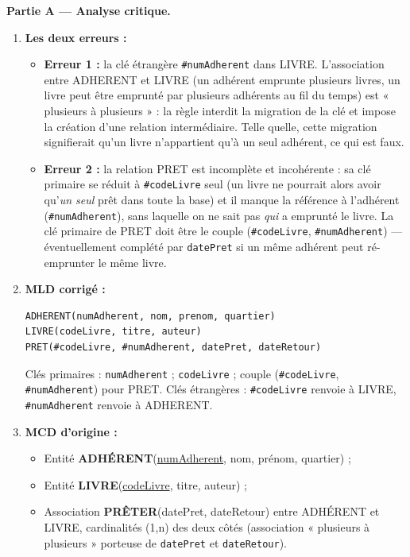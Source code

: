 \documentclass[11pt]{article}
\begin{document}
\begin{corrige}
\textbf{Partie A — Analyse critique.}

\begin{enumerate}
  \item \textbf{Les deux erreurs :}
  \begin{itemize}
    \item \textbf{Erreur 1 :} la clé étrangère \texttt{\#numAdherent} dans LIVRE. L'association entre ADHERENT et LIVRE (un adhérent emprunte plusieurs livres, un livre peut être emprunté par plusieurs adhérents au fil du temps) est « plusieurs à plusieurs » : la règle interdit la migration de la clé et impose la création d'une relation intermédiaire. Telle quelle, cette migration signifierait qu'un livre n'appartient qu'à un seul adhérent, ce qui est faux.
    \item \textbf{Erreur 2 :} la relation PRET est incomplète et incohérente : sa clé primaire se réduit à \texttt{\#codeLivre} seul (un livre ne pourrait alors avoir qu'\emph{un seul} prêt dans toute la base) et il manque la référence à l'adhérent (\texttt{\#numAdherent}), sans laquelle on ne sait pas \emph{qui} a emprunté le livre. La clé primaire de PRET doit être le couple (\texttt{\#codeLivre}, \texttt{\#numAdherent}) — éventuellement complété par \texttt{datePret} si un même adhérent peut ré-emprunter le même livre.
  \end{itemize}
  \item \textbf{MLD corrigé :}
\begin{lstlisting}
ADHERENT(numAdherent, nom, prenom, quartier)
LIVRE(codeLivre, titre, auteur)
PRET(#codeLivre, #numAdherent, datePret, dateRetour)
\end{lstlisting}
  Clés primaires : \texttt{numAdherent} ; \texttt{codeLivre} ; couple (\texttt{\#codeLivre}, \texttt{\#numAdherent}) pour PRET. Clés étrangères : \texttt{\#codeLivre} renvoie à LIVRE, \texttt{\#numAdherent} renvoie à ADHERENT.
  \item \textbf{MCD d'origine :}
  \begin{itemize}
    \item Entité \textbf{ADHÉRENT}(\underline{numAdherent}, nom, prénom, quartier) ;
    \item Entité \textbf{LIVRE}(\underline{codeLivre}, titre, auteur) ;
    \item Association \textbf{PRÊTER}(datePret, dateRetour) entre ADHÉRENT et LIVRE, cardinalités (1,n) des deux côtés (association « plusieurs à plusieurs » porteuse de \texttt{datePret} et \texttt{dateRetour}).
  \end{itemize}
\end{enumerate}


\end{corrige}
\end{document}
